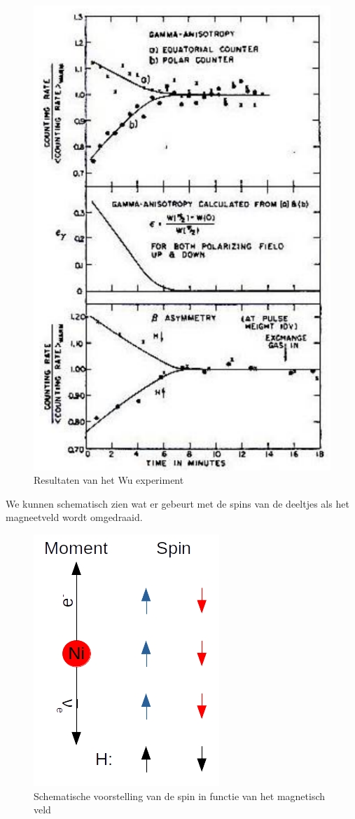 \documentclass[../main.tex]{subfiles}
\begin{document}
\begin{figure}[h]
    \centering
    \includegraphics[width=0.6\linewidth]{parity_violation/wu_resultaten.png}
    \caption{Resultaten van het Wu experiment}%
    \label{fig:parity_violation/wu_resultaten}
\end{figure}

We kunnen schematisch zien wat er gebeurt met de spins van de deeltjes als het magneetveld wordt omgedraaid.

\begin{figure}[h]
    \centering
    \includegraphics[width=0.4\linewidth]{parity_violation/wu.jpg}
    \caption{Schematische voorstelling van de spin in functie van het magnetisch veld}%
    \label{fig:parity_violation/wu}
\end{figure}
\end{document}

